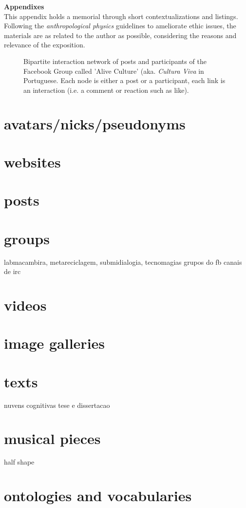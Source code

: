 \documentclass[a4paper]{article}
\begin{document}
\clearpage
{} 
\begin{appendices}
{\Large \bf Appendixes}
\\

This appendix holds a memorial through short contextualizations
and listings.
Following the \emph{anthropological physics} guidelines to ameliorate
ethic issues, the materials are as related to the author as possible,
considering the reasons and relevance of the exposition.

  \begin{figure}[!h]
  \centering
  \caption{Bipartite interaction network of posts and participants of the Facebook Group called 'Alive Culture' (aka. \emph{Cultura Viva} in Portuguese. Each node is either a post or a participant, each link is an interaction (i.e. a comment or reaction such as like).}
\end{figure}

\section{avatars/nicks/pseudonyms}\label{avatar}
\section{websites}
\section{posts}\label{posts}
\section{groups}
labmacambira, metareciclagem, submidialogia, tecnomagias
grupos do fb
canais de irc
\section{videos}
\section{image galleries}
\section{texts}
nuvens cognitivas
tese e dissertacao
\section{musical pieces}
half shape
\section{ontologies and vocabularies}
\end{appendices}
\end{document}

